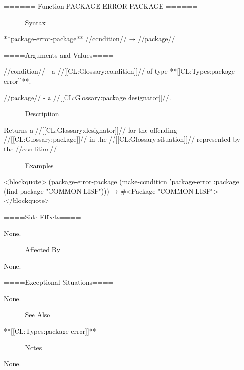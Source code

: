 ====== Function PACKAGE-ERROR-PACKAGE ======

====Syntax====

**package-error-package** //condition// → //package//

====Arguments and Values====

//condition// - a //[[CL:Glossary:condition]]// of type **[[CL:Types:package-error]]**.

//package// - a //[[CL:Glossary:package designator]]//.

====Description====

Returns a //[[CL:Glossary:designator]]// for the offending //[[CL:Glossary:package]]// in the //[[CL:Glossary:situation]]// represented by the //condition//.

====Examples====

<blockquote> (package-error-package (make-condition 'package-error :package (find-package "COMMON-LISP"))) → #<Package "COMMON-LISP"> </blockquote>

====Side Effects====

None.

====Affected By====

None.

====Exceptional Situations====

None.

====See Also====

**[[CL:Types:package-error]]**

====Notes====

None.

